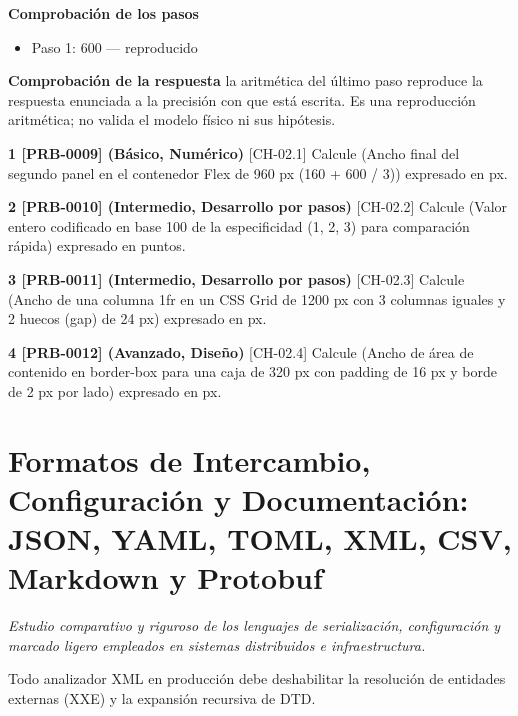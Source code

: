 \documentclass{book}
\begin{document}
\begin{tcolorbox}[title={Problema resuelto}, studiumworked, breakable]
\noindent\textbf{Comprobación de los pasos}
\begin{itemize}
\item Paso 1: $600$ — reproducido
\end{itemize}

\noindent\textbf{Comprobación de la respuesta} la aritmética del último paso reproduce la respuesta enunciada a la precisión con que está escrita. Es una reproducción aritmética; no valida el modelo físico ni sus hipótesis.
\end{tcolorbox}

\begin{tcolorbox}[title={Ejercicios}, studiumworked, breakable]

\noindent\textbf{1 [PRB-0009] (Básico, Numérico)}
[CH-02.1] Calcule (Ancho final del segundo panel en el contenedor Flex de 960 px (160 + 600 / 3)) expresado en px.

\noindent\textbf{2 [PRB-0010] (Intermedio, Desarrollo por pasos)}
[CH-02.2] Calcule (Valor entero codificado en base 100 de la especificidad (1, 2, 3) para comparación rápida) expresado en puntos.

\noindent\textbf{3 [PRB-0011] (Intermedio, Desarrollo por pasos)}
[CH-02.3] Calcule (Ancho de una columna 1fr en un CSS Grid de 1200 px con 3 columnas iguales y 2 huecos (gap) de 24 px) expresado en px.

\noindent\textbf{4 [PRB-0012] (Avanzado, Diseño)}
[CH-02.4] Calcule (Ancho de área de contenido en border-box para una caja de 320 px con padding de 16 px y borde de 2 px por lado) expresado en px.
\end{tcolorbox}

\chapter{Formatos de Intercambio, Configuración y Documentación: JSON, YAML, TOML, XML, CSV, Markdown y Protobuf}
\label{chap:ch-03}

\noindent\textit{Estudio comparativo y riguroso de los lenguajes de serialización, configuración y marcado ligero empleados en sistemas distribuidos e infraestructura.}

\begin{tcolorbox}[title={Consejo}, studiumtip, breakable]

Todo analizador XML en producción debe deshabilitar la resolución de entidades externas (XXE) y la expansión recursiva de DTD.
\end{tcolorbox}
\end{document}
